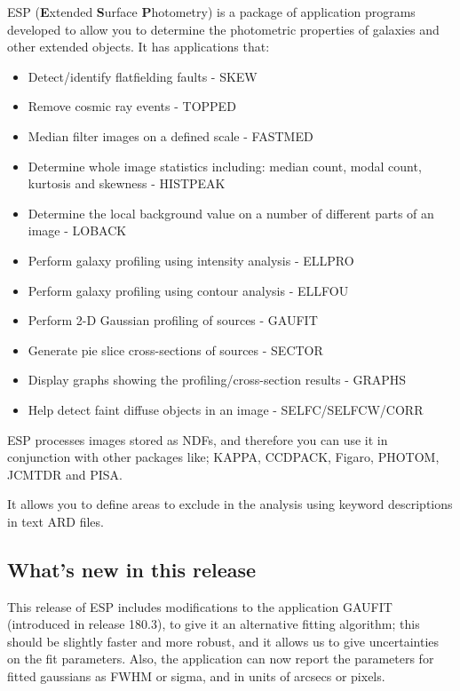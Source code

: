 \documentclass[twoside,11pt]{article}
\newcommand{\xref}[3]{#1}
\newcommand{\xlabel}[1]{}
\begin{document}
ESP ({\bf E}xtended {\bf S}urface {\bf P}hotometry) is a package 
of application programs developed to allow you to determine the photometric 
properties of galaxies and other extended objects. It has applications that:
\begin{itemize}
\item Detect/identify flatfielding faults - SKEW
\item Remove cosmic ray events - TOPPED
\item Median filter images on a defined scale - FASTMED
\item Determine whole image statistics including: median count, modal count,
kurtosis and skewness - HISTPEAK
\item Determine the local background value on a number of different parts
of an image - LOBACK
\item Perform galaxy profiling using intensity analysis - ELLPRO
\item Perform galaxy profiling using contour analysis - ELLFOU
\item Perform 2-D Gaussian profiling of sources - GAUFIT
\item Generate pie slice cross-sections of sources - SECTOR
\item Display graphs showing the profiling/cross-section results - GRAPHS
\item Help detect faint diffuse objects in an image - SELFC/SELFCW/CORR
\end{itemize}

ESP processes images stored as NDFs, and therefore you can use it in
conjunction with other packages like; 
\xref{KAPPA}{sun95}{},
\xref{CCDPACK}{sun139}{},
\xref{Figaro}{sun86}{},
\xref{PHOTOM}{sun45}{},
\xref{JCMTDR}{sun132}{}
 and
\xref{PISA}{sun109}{}. 

It allows you to define areas to exclude in the analysis
using keyword descriptions in text ARD files.

\subsection{What's new in this release}
\xlabel{WHATSNEW}
This release of ESP includes modifications to the application GAUFIT
(introduced in release 180.3), to give it an alternative fitting
algorithm; this should be slightly faster and more robust, and it
allows us to give uncertainties on the fit parameters.  Also, the
application can now report the parameters for fitted gaussians as
FWHM or sigma, and in units of arcsecs or pixels.
\end{document}
